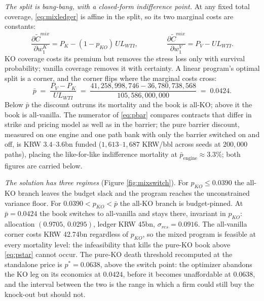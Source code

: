 \documentclass[11pt,a4paper]{article}
\begin{document}
\emph{The split is bang-bang, with a closed-form indifference point.} At any fixed total coverage, \eqref{eq:mixledger} is affine in the split, so its two marginal costs are constants:
\begin{equation}
\frac{\partial \widetilde C^{mix}}{\partial w_1^K} = P_K - (1-p_{KO})\,UL_{WTI}, \qquad\qquad \frac{\partial \widetilde C^{mix}}{\partial w_1^V} = P_V - UL_{WTI}.
\label{eq:margcost}
\end{equation}
KO coverage costs its premium but removes the stress loss only with survival probability; vanilla coverage removes it with certainty. A linear program's optimal split is a corner, and the corner flips where the marginal costs cross:
\begin{equation}
\bar p \;=\; \frac{P_V - P_K}{UL_{WTI}} \;=\; \frac{41{,}258{,}998{,}746 - 36{,}780{,}738{,}568}{105{,}586{,}000{,}000} \;=\; 0.0424.
\label{eq:pbar}
\end{equation}
Below $\bar p$ the discount outruns its mortality and the book is all-KO; above it the book is all-vanilla. The numerator of \eqref{eq:pbar} compares contracts that differ in strike and pricing model as well as in the barrier; the pure barrier discount, measured on one engine and one path bank with only the barrier switched on and off, is KRW $3.4$--$3.6$bn funded ($1{,}613$--$1{,}687$ KRW/bbl across seeds at $200{,}000$ paths), placing the like-for-like indifference mortality at $\bar p_{\mathrm{engine}}\approx3.3\%$; both figures are carried below.

\emph{The solution has three regimes} (Figure \ref{fig:mixswitch}). For $p_{KO} \le 0.0390$ the all-KO branch leaves the budget slack and the program reaches the unconstrained variance floor. For $0.0390 < p_{KO} < \bar p$ the all-KO branch is budget-pinned. At $\bar p = 0.0424$ the book switches to all-vanilla and stays there, invariant in $p_{KO}$: allocation $(0.9705,\,0.0295)$, ledger KRW 45bn, $\sigma_{res}=0.0916$. The all-vanilla corner costs KRW 42.74bn regardless of $p_{KO}$, so the mixed program is feasible at every mortality level: the infeasibility that kills the pure-KO book above \eqref{eq:pstar} cannot occur. The pure-KO death threshold recomputed at the standalone price is $p^*=0.0638$, above the switch point: the optimizer abandons the KO leg on its economics at $0.0424$, before it becomes unaffordable at $0.0638$, and the interval between the two is the range in which a firm could still buy the knock-out but should not.
\end{document}
